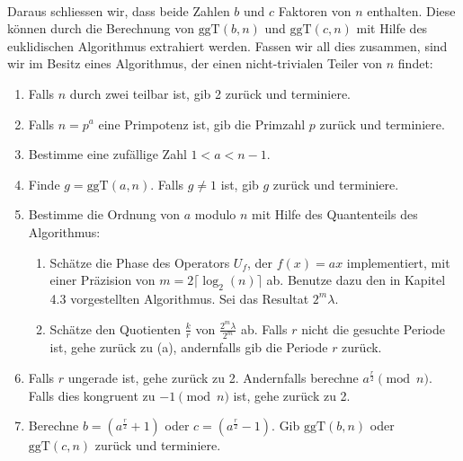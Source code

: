 \paragraph{}
Daraus schliessen wir, dass beide Zahlen $b$ und $c$ Faktoren von $n$ enthalten. Diese können durch die Berechnung von $\text{ggT}(b, n)$ und $\text{ggT}(c, n)$ mit Hilfe des euklidischen Algorithmus extrahiert werden. Fassen wir all dies zusammen, sind wir im Besitz eines Algorithmus, der einen nicht-trivialen Teiler von $n$ findet:
\begin{enumerate}
    \item Falls $n$ durch zwei teilbar ist, gib 2 zurück und terminiere.
    \item Falls $n = p^a$ eine Primpotenz ist, gib die Primzahl $p$ zurück und terminiere.
    \item Bestimme eine zufällige Zahl $1 < a < n - 1$.
    \item Finde $g = \text{ggT}(a, n)$. Falls $g \neq 1$ ist, gib $g$ zurück und terminiere.
    \item Bestimme die Ordnung von $a$ modulo $n$ mit Hilfe des Quantenteils des Algorithmus:
    \begin{enumerate}
        \item Schätze die Phase des Operators $U_f$, der $f(x) = ax$ implementiert, mit einer Präzision von $m = 2\lceil \log_2(n) \rceil$ ab. Benutze dazu den in Kapitel 4.3 vorgestellten Algorithmus. Sei das Resultat $2^m\lambda$.
        \item Schätze den Quotienten $\frac{k}{r}$ von $\frac{2^m\lambda}{2^m}$ ab. Falls $r$ nicht die gesuchte Periode ist, gehe zurück zu (a), andernfalls gib die Periode $r$ zurück.
    \end{enumerate}
    \item Falls $r$ ungerade ist, gehe zurück zu 2. Andernfalls berechne $a^{\frac{r}{2}} \pmod{n}$. Falls dies kongruent zu $-1 \pmod{n}$ ist, gehe zurück zu 2.
    \item Berechne $b = (a^\frac{r}{2} + 1)$ oder $c = (a^\frac{r}{2} - 1)$. Gib $\text{ggT}(b, n)$ oder $\text{ggT}(c, n)$ zurück und terminiere.
\end{enumerate}
